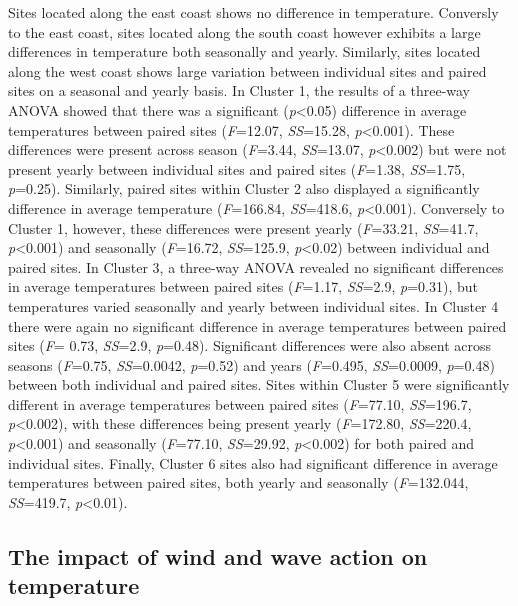 \documentclass[12pt,a4paper,]{article}
\begin{document}
Sites located along the east coast shows no difference in temperature.
Conversly to the east coast, sites located along the south coast however
exhibits a large differences in temperature both seasonally and yearly.
Similarly, sites located along the west coast shows large variation
between individual sites and paired sites on a seasonal and yearly
basis. In Cluster 1, the results of a three-way ANOVA showed that there
was a significant (\emph{p}\textless{}0.05) difference in average
temperatures between paired sites (\emph{F}=12.07, \emph{SS}=15.28,
\emph{p}\textless{}0.001). These differences were present across season
(\emph{F}=3.44, \emph{SS}=13.07, \emph{p}\textless{}0.002) but were not
present yearly between individual sites and paired sites (\emph{F}=1.38,
\emph{SS}=1.75, \emph{p}=0.25). Similarly, paired sites within Cluster 2
also displayed a significantly difference in average temperature
(\emph{F}=166.84, \emph{SS}=418.6, \emph{p}\textless{}0.001). Conversely
to Cluster 1, however, these differences were present yearly
(\emph{F}=33.21, \emph{SS}=41.7, \emph{p}\textless{}0.001) and
seasonally (\emph{F}=16.72, \emph{SS}=125.9, \emph{p}\textless{}0.02)
between individual and paired sites. In Cluster 3, a three-way ANOVA
revealed no significant differences in average temperatures between
paired sites (\emph{F}=1.17, \emph{SS}=2.9, \emph{p}=0.31), but
temperatures varied seasonally and yearly between individual sites. In
Cluster 4 there were again no significant difference in average
temperatures between paired sites (\emph{F}= 0.73, \emph{SS}=2.9,
\emph{p}=0.48). Significant differences were also absent across seasons
(\emph{F}=0.75, \emph{SS}=0.0042, \emph{p}=0.52) and years
(\emph{F}=0.495, \emph{SS}=0.0009, \emph{p}=0.48) between both
individual and paired sites. Sites within Cluster 5 were significantly
different in average temperatures between paired sites (\emph{F}=77.10,
\emph{SS}=196.7, \emph{p}\textless{}0.002), with these differences being
present yearly (\emph{F}=172.80, \emph{SS}=220.4,
\emph{p}\textless{}0.001) and seasonally (\emph{F}=77.10,
\emph{SS}=29.92, \emph{p}\textless{}0.002) for both paired and
individual sites. Finally, Cluster 6 sites also had significant
difference in average temperatures between paired sites, both yearly and
seasonally (\emph{F}=132.044, \emph{SS}=419.7, \emph{p}\textless{}0.01).

\hypertarget{the-impact-of-wind-and-wave-action-on-temperature}{%
\subsection{The impact of wind and wave action on
temperature}\label{the-impact-of-wind-and-wave-action-on-temperature}}
\end{document}
